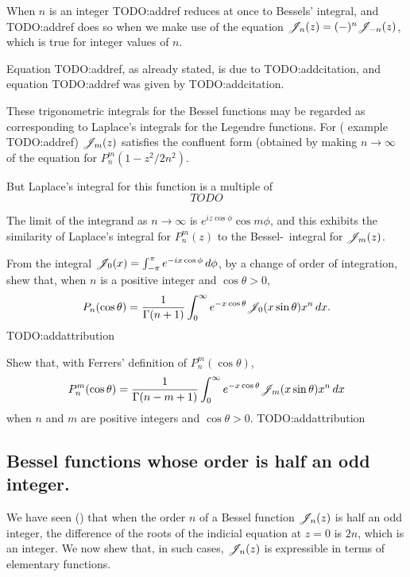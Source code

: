 \documentclass{book}
\begin{document}
When $n$ is an integer TODO:addref reduces at once to Bessels'
integral, and TODO:addref does so when we make use of the equation 
$\mathscr{J}_n(z) = (-)^n \mathscr{J}_{-n}(z)$, which is true for integer values of $n$.

%
%
Equation TODO:addref, as already stated, is due to TODO:addcitation,
and equation TODO:addref was given by TODO:addcitation.

These trigonometric integrals for the Bessel functions may be regarded
as corresponding to Laplace's integrals for the Legendre functions.
For ( example TODO:addref)
$\mathscr{J}_m(z)$ satisfies the confluent form (obtained by making 
$n \rightarrow \infty$ of the equation for
$P_n^m(1-z^2/2n^2)$.

But Laplace's integral for this function is a multiple of 
$$
TODO
$$

The limit of the integrand as $n \rightarrow \infty$ is 
$e^{iz\cos\phi}\cos m\phi$, and this exhibits the similarity of
Laplace's integral for $P_n^m(z)$ to the Bessel-\Schlafli\ integral for 
$\mathscr{J}_m(z)$.
\begin{wandwexample}
  From the integral
  $\mathscr{J}_0(x) = \int_{-\pi}^{\pi} e^{-ix\cos\phi}\, d\phi$, by a
  change of order of integration, shew that, when $n$ is a positive
  integer and $\cos\theta > 0$,
  $$
  P_n(\cos\theta)
  =
  \frac{1}{\Gamma(n+1)}
  \int_0^{\infty}
  e^{-x\cos\theta}
  \mathscr{J}_0(x\sin\theta)
  x^n
  \, d x.
  $$
  TODO:addattribution
\end{wandwexample}
\begin{wandwexample}
  Shew that, with Ferrers' definition of $P_n^m(\cos\theta)$,
  $$
  P_n^m(\cos\theta)
  =
  \frac{1}{\Gamma(n-m+1)}
  \int_0^{\infty}
  e^{-x\cos\theta}
  \mathscr{J}_m(x\sin\theta)
  x^n
  \, d x
  $$
  when $n$ and $m$ are positive integers and
  $\cos\theta > 0$.
  TODO:addattribution
\end{wandwexample}
\subsection{Bessel functions whose order is half an odd integer.}
We have seen () that when the order $n$ of a
Bessel function $\mathscr{J}_n(z)$ is half an odd integer, the difference of the
roots of the indicial equation at $z=0$ is $2n$, which is an integer.
We now shew that, in such cases, $\mathscr{J}_n(z)$ is expressible in terms of
elementary functions.
\end{document}
